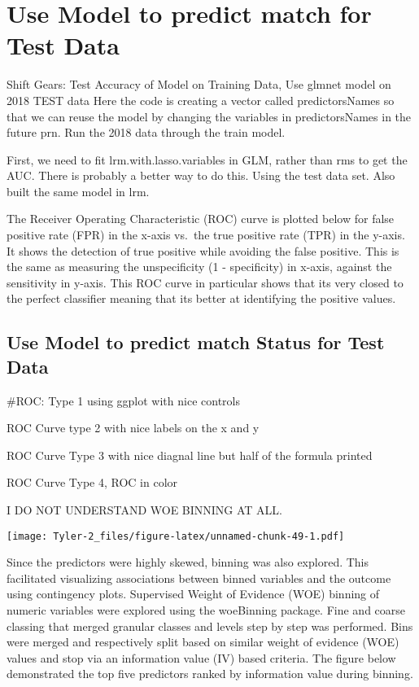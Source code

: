 \documentclass[12pt,]{article}
\begin{document}
\hypertarget{use-model-to-predict-match-for-test-data}{%
\section{Use Model to predict match for Test
Data}\label{use-model-to-predict-match-for-test-data}}

Shift Gears: Test Accuracy of Model on Training Data, Use glmnet model
on 2018 TEST data Here the code is creating a vector called
predictorsNames so that we can reuse the model by changing the variables
in predictorsNames in the future prn. Run the 2018 data through the
train model.

First, we need to fit lrm.with.lasso.variables in GLM, rather than rms
to get the AUC. There is probably a better way to do this. Using the
test data set. Also built the same model in lrm.

The Receiver Operating Characteristic (ROC) curve is plotted below for
false positive rate (FPR) in the x-axis vs.~the true positive rate (TPR)
in the y-axis. It shows the detection of true positive while avoiding
the false positive. This is the same as measuring the unspecificity (1 -
specificity) in x-axis, against the sensitivity in y-axis. This ROC
curve in particular shows that its very closed to the perfect classifier
meaning that its better at identifying the positive values.

\hypertarget{use-model-to-predict-match-status-for-test-data}{%
\subsection{Use Model to predict match Status for Test
Data}\label{use-model-to-predict-match-status-for-test-data}}

\#ROC: Type 1 using ggplot with nice controls

ROC Curve type 2 with nice labels on the x and y

ROC Curve Type 3 with nice diagnal line but half of the formula printed

ROC Curve Type 4, ROC in color

I DO NOT UNDERSTAND WOE BINNING AT ALL.

\texttt{[image: Tyler-2\_files/figure-latex/unnamed-chunk-49-1.pdf]}

Since the predictors were highly skewed, binning was also explored. This
facilitated visualizing associations between binned variables and the
outcome using contingency plots. Supervised Weight of Evidence (WOE)
binning of numeric variables were explored using the woeBinning package.
Fine and coarse classing that merged granular classes and levels step by
step was performed. Bins were merged and respectively split based on
similar weight of evidence (WOE) values and stop via an information
value (IV) based criteria. The figure below demonstrated the top five
predictors ranked by information value during binning.
\end{document}
